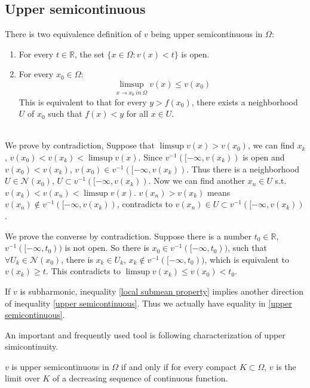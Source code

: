 \subsection{Upper semicontinuous}
There is two equivalence definition of $v$ being upper semicontinuous in $\Omega$:
\begin{enumerate}
    \item For every $t\in\mathbb{R}$, the set $\{x\in\Omega: v(x)<t\}$ is open.
    \item For every $x_0\in\Omega$:
          \begin{equation}
              \limsup_{x\to x_0~in~\Omega}{v(x)\leq v(x_0)}\label{upper semicontinuous}
          \end{equation}
          This is equivalent to that for every $y>f(x_{0})$, there exists a neighborhood $U$ of $x_{0}$ such that $f(x)<y$ for all $x \in U$.
\end{enumerate}
\begin{remark}\ \\
    We prove by contradiction, Suppose that $\limsup{v(x)>v(x_0)}$, we can find $x_k$, $v(x_0)<v(x_k)<\limsup{v(x)}$. Since $v^{-1}([-\infty,v(x_k))$ is open and $v(x_0)<v(x_k)$,
    $v(x_0)\in v^{-1}([-\infty,v(x_k))$. Thus there is a neighborhood $U\in\mathscr{N}(x_0)$, $U\subset v^{-1}([-\infty,v(x_k))$. Now we can find another $x_n\in U$
    s.t. $v(x_k)<v(x_n)<\limsup{v(x)}$. $v(x_n)>v(x_k)$ means $v(x_n)\notin v^{-1}([-\infty,v(x_k))$, contradicts to $v(x_n)\in U\subset v^{-1}([-\infty,v(x_k))$.\par
    We prove the converse by contradiction. Suppose there is a number $t_0\in\mathbb{R}$, $v^{-1}([-\infty,t_0))$ is not open. So there is
    $x_0\in v^{-1}([-\infty,t_0))$, such that $\forall U_k\in\mathscr{N}(x_0)$, there is $x_k\in U_k$, $x_k\notin v^{-1}([-\infty,t_0))$, which is equivalent to $v(x_k)\geq t$. This contradicts to $\limsup{v(x_k)}\leq v(x_0)<t_0$.
\end{remark}
If $v$ is subharmonic, inequality \eqref{local submean property} implies another direction of inequality \eqref{upper semicontinuous}.
Thus we actually have equality in \eqref{upper semicontinuous}.\par
An important and frequently used tool is following characterization of upper simicontinuity.
\begin{proposition}\label{characterization of semicontinuous}
    $v$ is upper semicontinuous in $\Omega$ if and only if for every compact $K\subset\Omega$, $v$ is the limit over $K$ of a
    decreasing sequence of continuous function.
\end{proposition}
